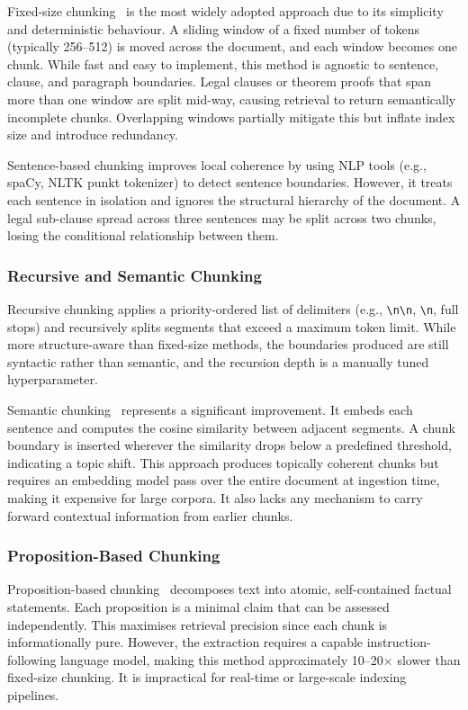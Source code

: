 \documentclass[12pt,a4paper]{article}
\begin{document}
Fixed-size chunking~\cite{lewis2020rag} is the most widely adopted approach
due to its simplicity and deterministic behaviour. A sliding window of a
fixed number of tokens (typically 256--512) is moved across the document,
and each window becomes one chunk. While fast and easy to implement, this
method is agnostic to sentence, clause, and paragraph boundaries. Legal
clauses or theorem proofs that span more than one window are split mid-way,
causing retrieval to return semantically incomplete chunks. Overlapping
windows partially mitigate this but inflate index size and introduce
redundancy.

Sentence-based chunking improves local coherence by using NLP tools (e.g.,
spaCy, NLTK punkt tokenizer) to detect sentence boundaries. However, it
treats each sentence in isolation and ignores the structural hierarchy of the
document. A legal sub-clause spread across three sentences may be split
across two chunks, losing the conditional relationship between them.

\subsubsection{Recursive and Semantic Chunking}

Recursive chunking applies a priority-ordered list of delimiters
(e.g., \texttt{\textbackslash n\textbackslash n}, \texttt{\textbackslash n},
full stops) and recursively splits segments that exceed a maximum token
limit. While more structure-aware than fixed-size methods, the boundaries
produced are still syntactic rather than semantic, and the recursion depth
is a manually tuned hyperparameter.

Semantic chunking~\cite{gao2024survey} represents a significant improvement.
It embeds each sentence and computes the cosine similarity between adjacent
segments. A chunk boundary is inserted wherever the similarity drops below
a predefined threshold, indicating a topic shift. This approach produces
topically coherent chunks but requires an embedding model pass over the
entire document at ingestion time, making it expensive for large corpora.
It also lacks any mechanism to carry forward contextual information from
earlier chunks.

\subsubsection{Proposition-Based Chunking}

Proposition-based chunking~\cite{chen2023dense} decomposes text into atomic,
self-contained factual statements. Each proposition is a minimal claim that
can be assessed independently. This maximises retrieval precision since each
chunk is informationally pure. However, the extraction requires a capable
instruction-following language model, making this method approximately
10--20$\times$ slower than fixed-size chunking. It is impractical for
real-time or large-scale indexing pipelines.
\end{document}
